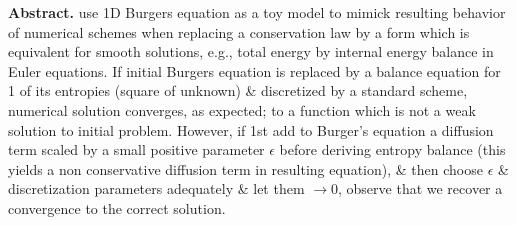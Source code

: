 \documentclass{article}
\begin{document}
\begin{enumerate}
	{\bf Abstract.} use 1D Burgers equation as a toy model to mimick resulting behavior of numerical schemes when replacing a conservation law by a form which is equivalent for smooth solutions, e.g., total energy by internal energy balance in Euler equations. If initial Burgers equation is replaced by a balance equation for 1 of its entropies (square of unknown) \& discretized by a standard scheme, numerical solution converges, as expected; to a function which is not a weak solution to initial problem. However, if 1st add to Burger's equation a diffusion term scaled by a small positive parameter $\epsilon$ before deriving entropy balance (this yields a non conservative diffusion term in resulting equation), \& then choose $\epsilon$ \& discretization parameters adequately \& let them $\to0$, observe that we recover a convergence to the correct solution.
	

\end{enumerate}
\end{document}
